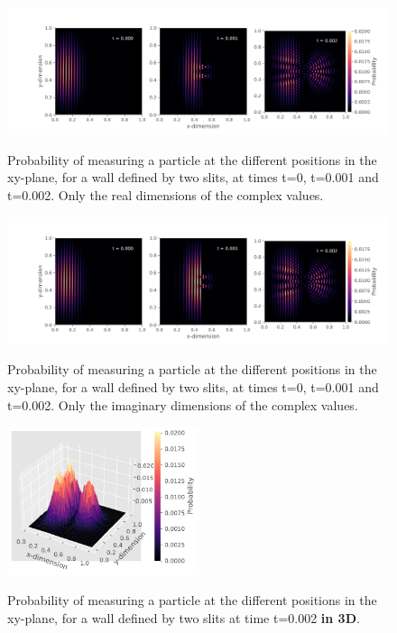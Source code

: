 \documentclass[10pt, nofootinbib, twocolumn]{revtex4-1}
\begin{document}
\begin{figure}
    \caption{Probability of measuring a particle at the different positions in the xy-plane, for a wall defined by two slits, at times t=0, t=0.001 and t=0.002. Only the real dimensions of the complex values.}
    \centering
    \includegraphics[width = 1\textwidth]{figures/plots_real.pdf} 
    \label{fig:doubleprobre}
\end{figure} 

\begin{figure}
    \caption{Probability of measuring a particle at the different positions in the xy-plane, for a wall defined by two slits, at times t=0, t=0.001 and t=0.002. Only the imaginary dimensions of the complex values.}
    \centering
    \includegraphics[width = 1\textwidth]{figures/plots_imag.pdf} 
    \label{fig:doubleprobim}
\end{figure} 


\begin{figure}[H]
    \caption{Probability of measuring a particle at the different positions in the xy-plane, for a wall defined by two slits at time t=0.002 \textbf{in 3D}.}
    \centering
    \includegraphics[width = 0.5\textwidth]{figures/plot_both_3d.pdf} 
    \label{fig:doubleprob3D}
\end{figure} 
\end{document}
